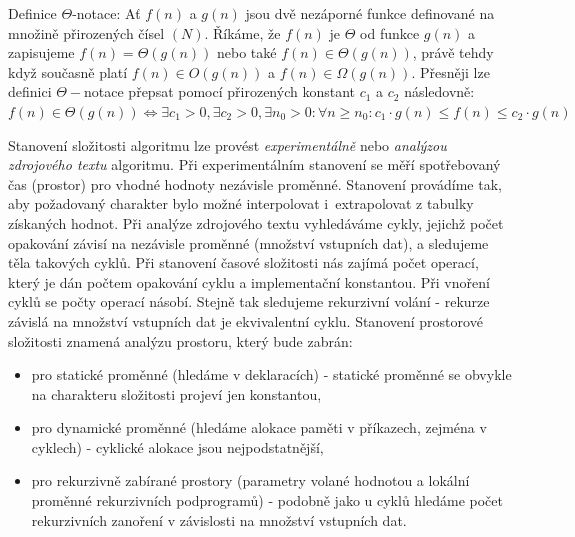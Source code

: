 \documentclass[12pt]{article}
\begin{document}
\newline
Definice $\Theta$-notace:
\newline
Ať $f(n)$ a $g(n)$ jsou dvě nezáporné funkce definované na množině přirozených čísel $(N)$. Říkáme, že $f(n)$ je $\Theta$ od funkce $g(n)$ a zapisujeme $f(n) = \Theta(g(n))$ nebo také $f(n) \in \Theta(g(n))$, právě tehdy když současně platí $f(n) \in O(g(n))$ a $f(n) \in \Omega(g(n))$. Přesněji lze definici $\Theta-$notace přepsat pomocí přirozených konstant $c_1$ a $c_2$ následovně:
\newline
$f(n) \in \Theta(g(n)) \Leftrightarrow \exists c_1 > 0, \exists c_2 > 0, \exists n_0 > 0:\forall n \geq n_0: c_1 \cdot g(n) \leq f(n) \leq c_2 \cdot g(n)$ \citep{hanak}

Stanovení složitosti algoritmu lze provést \textit{experimentálně} nebo \textit{analýzou zdrojového textu} algoritmu. Při experimentálním stanovení se měří spotřebovaný čas (prostor) pro vhodné hodnoty nezávisle proměnné. Stanovení provádíme tak, aby požadovaný charakter bylo možné interpolovat i~extrapolovat z tabulky získaných hodnot.
\newline
\indent
Při analýze zdrojového textu vyhledáváme cykly, jejichž počet opakování závisí na nezávisle proměnné (množství vstupních dat), a sledujeme těla takových cyklů.
\newline
\indent
Při stanovení časové složitosti nás zajímá počet operací, který je dán počtem opakování cyklu a implementační konstantou. Při vnoření cyklů se počty operací násobí. Stejně tak sledujeme rekurzivní volání - rekurze závislá na množství vstupních dat je ekvivalentní cyklu.
\newline
\indent
Stanovení prostorové složitosti znamená analýzu prostoru, který bude zabrán:
\begin{itemize}
\item pro statické proměnné (hledáme v deklaracích) - statické proměnné se obvykle na charakteru složitosti projeví jen konstantou,
\item pro dynamické proměnné (hledáme alokace paměti v příkazech, zejména v cyklech) - cyklické alokace jsou nejpodstatnější,
\item pro rekurzivně zabírané prostory (parametry volané hodnotou a lokální proměnné rekurzivních podprogramů) - podobně jako u cyklů hledáme počet rekurzivních zanoření v závislosti na množství vstupních dat.
\end{itemize}
\end{document}
